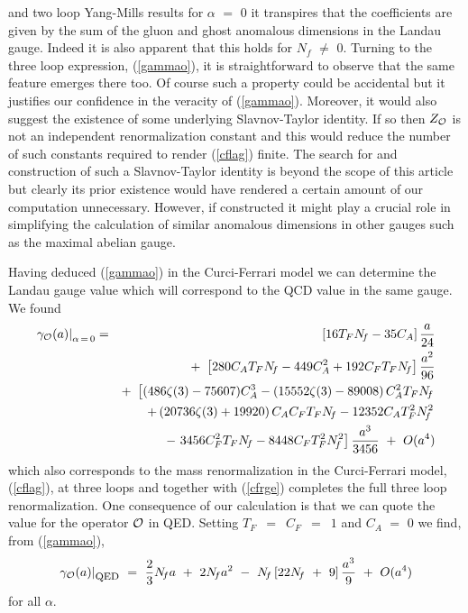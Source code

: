 \documentclass[a4paper,11pt]{article}
\newcommand{\Nf}{N_{\!f}}
\begin{document}
and two loop Yang-Mills results for $\alpha$ $=$ $0$ it transpires that the 
coefficients are given by the sum of the gluon and ghost anomalous dimensions 
in the Landau gauge. Indeed it is also apparent that this holds for $\Nf$ 
$\neq$ $0$. Turning to the three loop expression, (\ref{gammao}), it is 
straightforward to observe that the same feature emerges there too. Of course 
such a property could be accidental but it justifies our confidence in the 
veracity of (\ref{gammao}). Moreover, it would also suggest the existence of 
some underlying Slavnov-Taylor identity. If so then $Z_{\cal O}$ is not an 
independent renormalization constant and this would reduce the number of such 
constants required to render (\ref{cflag}) finite. The search for and 
construction of such a Slavnov-Taylor identity is beyond the scope of this 
article but clearly its prior existence would have rendered a certain amount of
our computation unnecessary. However, if constructed it might play a crucial 
role in simplifying the calculation of similar anomalous dimensions in other 
gauges such as the maximal abelian gauge.

Having  deduced  (\ref{gammao}) in the Curci-Ferrari model we can determine
the Landau gauge value which will correspond to the QCD value in the same
gauge. We found  
\begin{eqnarray} 
\left. \gamma_{\cal O}(a) \right|_{\alpha \, = \, 0} &=& \left[ 16 T_F \Nf 
- 35 C_A \right] \frac{a}{24} \nonumber \\
&& +~ \left[ 280 C_A T_F \Nf - 449 C_A^2 + 192 C_F T_F \Nf \right] 
\frac{a^2}{96} \nonumber \\
&& +~ \left[ ( 486\zeta(3) - 75607 ) C_A^3 - \left( 15552\zeta(3) - 89008 
\right) C_A^2 T_F \Nf \right. \nonumber \\ 
&& \left. ~~~~~+ \left( 20736\zeta(3) + 19920 \right) C_A C_F T_F \Nf 
- 12352 C_A T_F^2 \Nf^2 \right. \nonumber \\ 
&& \left. ~~~~~-~ 3456 C_F^2 T_F \Nf - 8448 C_F T_F^2 \Nf^2 \right] 
\frac{a^3}{3456} ~+~ O(a^4) 
\end{eqnarray} 
which also corresponds to the mass renormalization in the Curci-Ferrari model, 
(\ref{cflag}), at three loops and together with (\ref{cfrge}) completes the 
full three loop renormalization. One consequence of our calculation is that we 
can quote the value for the operator ${\cal O}$ in QED. Setting 
$T_F$~$=$~$C_F$~$=$~$1$ and $C_A$ $=$ $0$ we find, from (\ref{gammao}),  
\begin{equation} 
\left. \gamma_{\cal O}(a) \right|_{\mbox{\footnotesize{QED}}} ~=~ \frac{2}{3} 
\Nf a ~+~ 2 \Nf a^2 ~-~ \Nf \left[ 22\Nf ~+~ 9 \right] \frac{a^3}{9} ~+~ O(a^4)
\end{equation}  
for all $\alpha$. 
\end{document}
